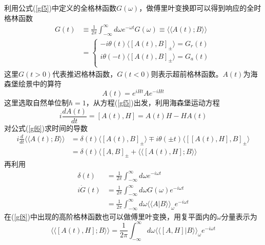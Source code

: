 \qquad 利用公式(\ref{gf5})中定义的全格林函数$G(\omega)$，做傅里叶变换即可以得到响应的全时格林函数
\begin{equation}
\begin{aligned}
G(t)&\equiv\frac{1}{2\pi}\int_{-\infty}^{\infty}d\omega e^{-\omega t}G(\omega)\equiv\langle\langle A(t);B\rangle\rangle\\
&=\left\{
\begin{array}{cc}
-i\theta(t)\langle \left[A(t),B\right]_\pm\rangle=G_r(t)\\
i\theta(-t)\langle \left[A(t),B\right]_\pm\rangle=G_a(t)\\
\end{array}
\right.\label{gf6}
\end{aligned}
\end{equation}
这里$G(t>0)$代表推迟格林函数，$G(t<0)$则表示超前格林函数。$A(t)$为海森堡绘景中的算符
\begin{equation}
A(t)=e^{iHt}Ae^{-iHt}\label{hs1}
\end{equation}
这里选取自然单位制$\hbar=1$，从方程(\ref{gf5})出发，利用海森堡运动方程
\begin{equation}
i\frac{dA(t)}{dt}=\left[A(t),H\right]=A(t)H-HA(t)
\end{equation}
对公式(\ref{gf6})求时间的导数
\begin{equation}
\begin{aligned}
i\frac{d}{dt}\langle\langle A(t);B\rangle\rangle&=\delta(t)\langle \left[A(t),B\right]_\pm\rangle\mp i\theta(\pm t)\langle\left[\left[A(t),H\right],B\right]_\pm\rangle\\
&=\delta(t)\langle\left[A,B\right]_\pm+\langle\langle\left[A(t),H\right];B\rangle\rangle\label{gf7}
\end{aligned}
\end{equation}
再利用
\begin{equation}
\begin{aligned}
\delta(t)&=\frac{1}{2\pi}\int_{-\infty}^{\infty}d\omega e^{-i\omega t}\\
i\dot{G}(t)&=\frac{1}{2\pi}\int_{-\infty}^{\infty}d\omega G(\omega)e^{-i\omega t}\\
&=\frac{1}{2\pi}\int_{-\infty}^{\infty}d\omega \langle\langle A|B\rangle\rangle_\omega e^{-i\omega t}\label{gf8}
\end{aligned}
\end{equation}
在(\ref{gf8})中出现的高阶格林函数也可以做傅里叶变换，用复平面内的$\omega$分量表示为
\begin{equation}
\langle\langle\left[A(t),H\right];B\rangle\rangle=\frac{1}{2\pi}\int_{-\infty}^{\infty}d\omega \langle\langle\left[A,H\right]|B\rangle\rangle_\omega e^{-i\omega t}\label{gf9}
\end{equation}
